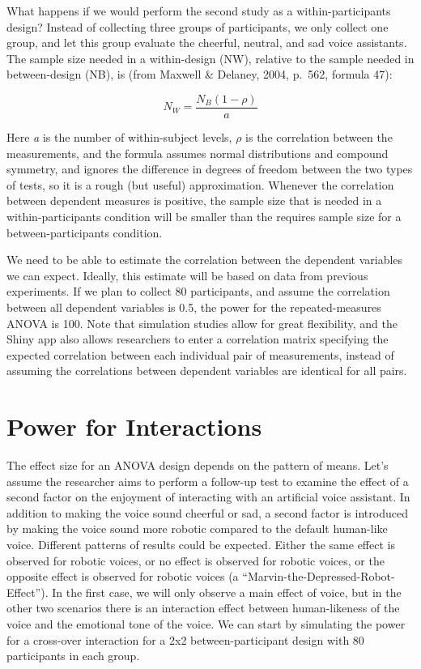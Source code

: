\documentclass[,man,floatsintext]{apa6}
\begin{document}
What happens if we would perform the second study as a
within-participants design? Instead of collecting three groups of
participants, we only collect one group, and let this group evaluate the
cheerful, neutral, and sad voice assistants. The sample size needed in a
within-design (NW), relative to the sample needed in between-design
(NB), is (from Maxwell \& Delaney, 2004, p.~562, formula 47):

\begin{equation}
N_{W}=\frac{N_{B}(1-\rho)}{a} \label{eq:within_n}
\end{equation}

Here \emph{a} is the number of within-subject levels, \(\rho\) is the
correlation between the measurements, and the formula assumes normal
distributions and compound symmetry, and ignores the difference in
degrees of freedom between the two types of tests, so it is a rough (but
useful) approximation. Whenever the correlation between dependent
measures is positive, the sample size that is needed in a
within-participants condition will be smaller than the requires sample
size for a between-participants condition.

We need to be able to estimate the correlation between the dependent
variables we can expect. Ideally, this estimate will be based on data
from previous experiments. If we plan to collect 80 participants, and
assume the correlation between all dependent variables is 0.5, the power
for the repeated-measures ANOVA is 100. Note that simulation studies
allow for great flexibility, and the Shiny app also allows researchers
to enter a correlation matrix specifying the expected correlation
between each individual pair of measurements, instead of assuming the
correlations between dependent variables are identical for all pairs.

\section{Power for Interactions}\label{power-for-interactions}

The effect size for an ANOVA design depends on the pattern of means.
Let's assume the researcher aims to perform a follow-up test to examine
the effect of a second factor on the enjoyment of interacting with an
artificial voice assistant. In addition to making the voice sound
cheerful or sad, a second factor is introduced by making the voice sound
more robotic compared to the default human-like voice. Different
patterns of results could be expected. Either the same effect is
observed for robotic voices, or no effect is observed for robotic
voices, or the opposite effect is observed for robotic voices (a
\enquote{Marvin-the-Depressed-Robot-Effect}). In the first case, we will
only observe a main effect of voice, but in the other two scenarios
there is an interaction effect between human-likeness of the voice and
the emotional tone of the voice. We can start by simulating the power
for a cross-over interaction for a 2x2 between-participant design with
80 participants in each group.
\end{document}
